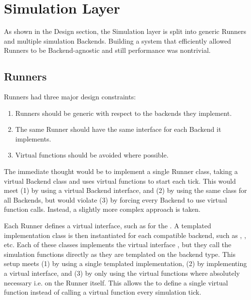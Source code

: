 \section{Simulation Layer}
As shown in the Design section, the Simulation layer is split into generic Runners and multiple simulation Backends.
Building a system that efficiently allowed Runners to be Backend-agnostic and still performance was nontrivial.

\subsection{Runners}
Runners had three major design constraints:
\begin{enumerate}
    \item Runners should be generic with respect to the backends they implement.
    \item The same Runner should have the same interface for each Backend it implements.
    \item Virtual functions should be avoided where possible.
\end{enumerate}
The immediate thought would be to implement a single Runner class, taking a virtual Backend class and uses virtual functions to start each tick.
This would meet (1) by using a virtual Backend interface, and (2) by using the same class for all Backends, but would violate (3) by forcing every Backend to use virtual function calls.
Instead, a slightly more complex approach is taken.

Each Runner defines a virtual interface, such as  for the .
A templated implementation class is then instantiated for each compatible backend, such as , , etc.
Each of these classes implements the virtual interface , but they call the simulation functions directly as they are templated on the backend type.
This setup meets (1) by using a single templated implementation, (2) by implementing a virtual interface, and (3) by only using the virtual functions where absolutely necessary i.e. on the Runner itself.
This allows the  to define a single virtual function  instead of calling a virtual function every simulation tick.

